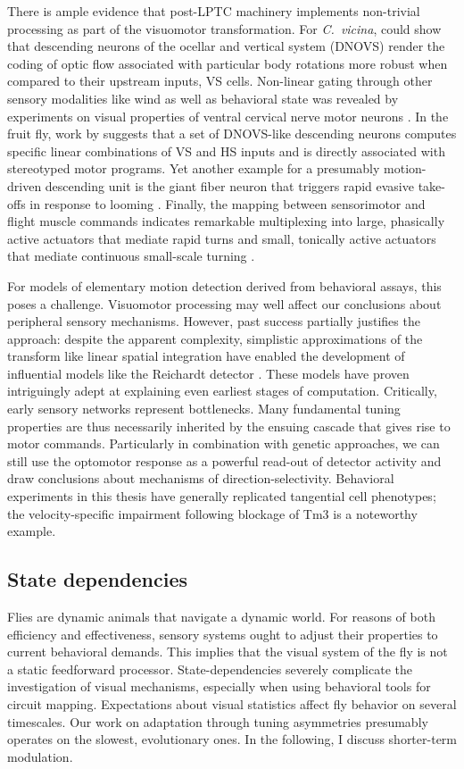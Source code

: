 There is ample evidence that post-LPTC machinery implements non-trivial processing as part of the visuomotor transformation. For \textit{C.\ vicina}, \citet{Wertz:2009hb} could show that descending neurons of the ocellar and vertical system (DNOVS) render the coding of optic flow associated with particular body rotations more robust when compared to their upstream inputs, VS cells. Non-linear gating through other sensory modalities like wind as well as behavioral state was revealed by experiments on visual properties of ventral cervical nerve motor neurons \citep{Haag:2010fy}. In the fruit fly, work by \citet{Suver:2016aa} suggests that a set of DNOVS-like descending neurons computes specific linear combinations of VS and HS inputs and is directly associated with stereotyped motor programs. Yet another example for a presumably motion-driven descending unit is the giant fiber neuron that triggers rapid evasive take-offs in response to looming \citep{Reyn:2014aa}. Finally, the mapping between sensorimotor and flight muscle commands indicates remarkable multiplexing into large, phasically active actuators that mediate rapid turns and small, tonically active actuators that mediate continuous small-scale turning \citep{Lindsay:2017aa}.

For models of elementary motion detection derived from behavioral assays, this poses a challenge. Visuomotor processing may well affect our conclusions about peripheral sensory mechanisms. However, past success partially justifies the approach: despite the apparent complexity, simplistic approximations of the transform like linear spatial integration have enabled the development of influential models like the Reichardt detector \citep{Hassenstein:1956fa}. These models have proven intriguingly adept at explaining even earliest stages of computation. Critically, early sensory networks represent bottlenecks. Many fundamental tuning properties are thus necessarily inherited by the ensuing cascade that gives rise to motor commands. Particularly in combination with genetic approaches, we can still use the optomotor response as a powerful read-out of detector activity and draw conclusions about mechanisms of direction-selectivity. Behavioral experiments in this thesis have generally replicated tangential cell phenotypes; the velocity-specific impairment following blockage of Tm3 is a noteworthy example.


\subsection{State dependencies}
Flies are dynamic animals that navigate a dynamic world. For reasons of both efficiency and effectiveness, sensory systems ought to adjust their properties to current behavioral demands. This implies that the visual system of the fly is not a static feedforward processor. State-dependencies severely complicate the investigation of visual mechanisms, especially when using behavioral tools for circuit mapping. Expectations about visual statistics affect fly behavior on several timescales. Our work on adaptation through tuning asymmetries presumably operates on the slowest, evolutionary ones. In the following, I discuss shorter-term modulation.

